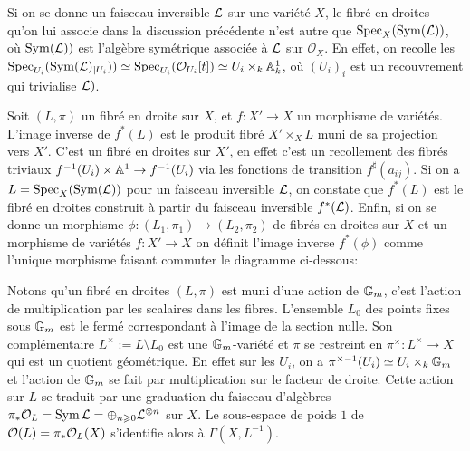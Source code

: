 \begin{rem}
Si on se donne un faisceau inversible $\mathcal{L}$ sur une variété $X$, le fibré en droites qu'on lui associe dans la discussion précédente n'est autre que $\operatorname{Spec}_X(\operatorname{Sym}(\mathcal{L}))$, où $\operatorname{Sym}(\mathcal{L}))$ est l'algèbre symétrique associée à $\mathcal{L}$ sur $\mathcal{O}_X$. En effet, on recolle les $\operatorname{Spec}_{U_i}(\operatorname{Sym}(\mathcal{L})_{|U_i}))\simeq\operatorname{Spec}_{U_i}( \mathcal{O}_{U_i}[t])\simeq U_i \times_k \mathbb{A}^1_k$, où $(U_i)_i$ est un recouvrement qui trivialise $\mathcal{L})$.
\end{rem}

Soit $(L,\pi)$ un fibré en droite sur $X$, et $f:X'\rightarrow X$ un morphisme de variétés. L'image inverse de $f^*(L)$ est le produit fibré $X'\times_X L$ muni de sa projection vers $X'$. C'est un fibré en droites sur $X'$, en effet c'est un recollement des fibrés triviaux $f^{-1}(U_i)\times \mathbb{A}^1\rightarrow f^{-1}(U_i)$ via les fonctions de transition $f^\sharp(a_{ij})$. Si on a $L=\operatorname{Spec}_X(\operatorname{Sym}(\mathcal{L}))$ pour un faisceau inversible $\mathcal{L}$, on constate que $f^*(L)$ est le fibré en droites construit à partir du faisceau inversible $f^*(\mathcal{L})$. Enfin, si on se donne un morphisme $\phi:(L_1,\pi_1)\rightarrow (L_2,\pi_2)$ de fibrés en droites sur $X$ et un morphisme de variétés $f:X'\rightarrow X$ on définit l'image inverse $f^*(\phi)$ comme l'unique morphisme faisant commuter le diagramme ci-dessous:

	\begin{center}
	\end{center}

\begin{rem}\label{remfibsectionsglobales}
Notons qu'un fibré en droites $(L, \pi)$ est muni d'une action de $\mathbb{G}_m$, c'est l'action de multiplication par les scalaires dans les fibres. L'ensemble $L_0$ des points fixes sous $\mathbb{G}_m$ est le fermé correspondant à l'image de la section nulle. Son complémentaire $L^\times:=L\setminus L_0$ est une $\mathbb{G}_m$-variété et $\pi$ se restreint en $\pi^\times: L^\times \rightarrow X$ qui est un quotient géométrique. En effet sur les $U_i$, on a $\pi^{\times-1}(U_i) \simeq U_i\times_k \mathbb{G}_m$ et l'action de $\mathbb{G}_m$ se fait par multiplication sur le facteur de droite. Cette action sur $L$  se traduit par une graduation du faisceau d'algèbres $\pi_*\mathcal{O}_L=\operatorname{Sym}\mathcal{L}=\oplus_{n\geqslant 0}\mathcal{L}^{\otimes n}$ sur $X$. Le sous-espace de poids $1$ de $\mathcal{O}(L)=\pi_*\mathcal{O}_L(X)$ s'identifie alors à $\Gamma(X,L^{-1})$.
\end{rem}



